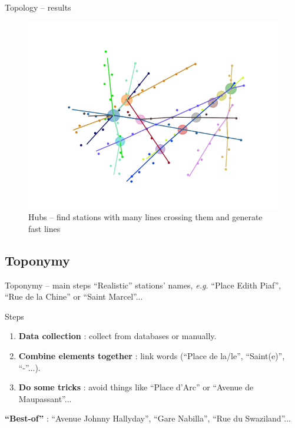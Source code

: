 \begin{frame}{Topology -- results}
	\begin{figure}
		\centering
		\includegraphics[width=0.7\linewidth]{images/net_7.png}
		\caption{Hubs -- find stations with many lines crossing them and generate fast lines}
	\end{figure}
\end{frame}


\subsection{Toponymy}
\begin{frame}{Toponymy -- main steps}
	 ``Realistic'' stations' names, \textit{e.g.} ``Place Edith Piaf'', ``Rue de la Chine'' or ``Saint Marcel''...
	\begin{block}{Steps}
		\begin{enumerate}
			\item \textbf{Data collection} : collect from databases or manually.
			\item \textbf{Combine elements together} : link words (``Place de la/le'', ``Saint(e)'', ``-''...).
			\item \textbf{Do some tricks} : avoid things like ``Place d'Arc'' or ``Avenue de Maupassant''... 
		\end{enumerate}
	\end{block}
	\textbf{``Best-of''} : ``Avenue Johnny Hallyday'', ``Gare Nabilla'', ``Rue du Swaziland''...
\end{frame}

